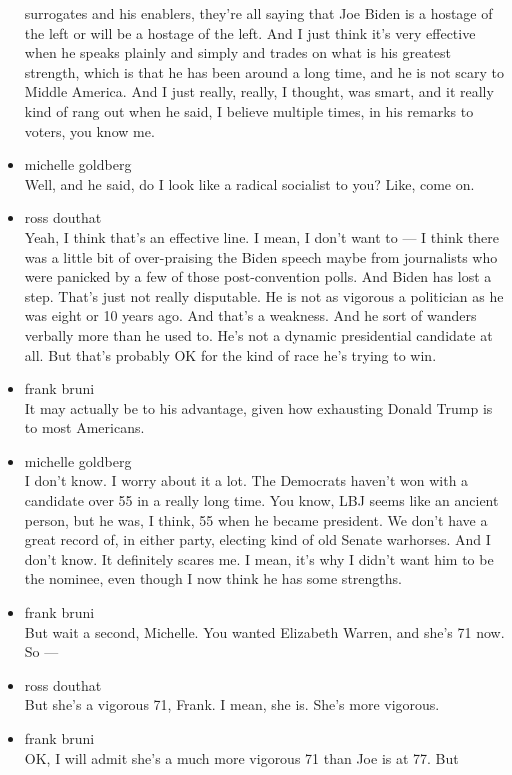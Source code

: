 \begin{itemize}
  surrogates and his enablers, they're all saying that Joe Biden is a
  hostage of the left or will be a hostage of the left. And I just think
  it's very effective when he speaks plainly and simply and trades on
  what is his greatest strength, which is that he has been around a long
  time, and he is not scary to Middle America. And I just really,
  really, I thought, was smart, and it really kind of rang out when he
  said, I believe multiple times, in his remarks to voters, you know me.
\item
  michelle goldberg\\
  Well, and he said, do I look like a radical socialist to you? Like,
  come on.
\item
  ross douthat\\
  Yeah, I think that's an effective line. I mean, I don't want to --- I
  think there was a little bit of over-praising the Biden speech maybe
  from journalists who were panicked by a few of those post-convention
  polls. And Biden has lost a step. That's just not really disputable.
  He is not as vigorous a politician as he was eight or 10 years ago.
  And that's a weakness. And he sort of wanders verbally more than he
  used to. He's not a dynamic presidential candidate at all. But that's
  probably OK for the kind of race he's trying to win.
\item
  frank bruni\\
  It may actually be to his advantage, given how exhausting Donald Trump
  is to most Americans.
\item
  michelle goldberg\\
  I don't know. I worry about it a lot. The Democrats haven't won with a
  candidate over 55 in a really long time. You know, LBJ seems like an
  ancient person, but he was, I think, 55 when he became president. We
  don't have a great record of, in either party, electing kind of old
  Senate warhorses. And I don't know. It definitely scares me. I mean,
  it's why I didn't want him to be the nominee, even though I now think
  he has some strengths.
\item
  frank bruni\\
  But wait a second, Michelle. You wanted Elizabeth Warren, and she's 71
  now. So ---
\item
  ross douthat\\
  But she's a vigorous 71, Frank. I mean, she is. She's more vigorous.
\item
  frank bruni\\
  OK, I will admit she's a much more vigorous 71 than Joe is at 77. But

\end{itemize}
